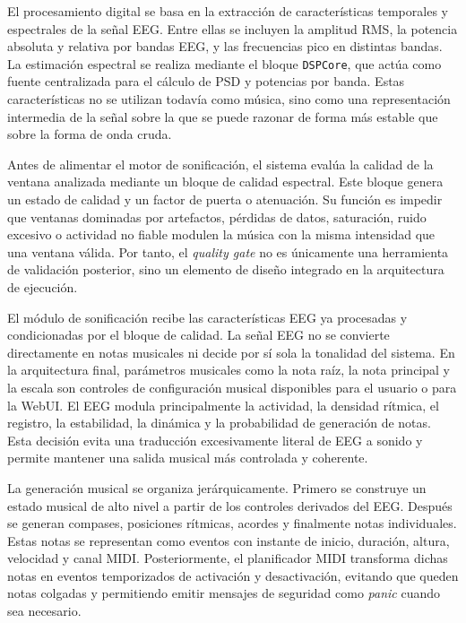 \documentclass[../main.tex]{subfiles}
\begin{document}
El procesamiento digital se basa en la extracción de características temporales y espectrales de la señal EEG. Entre ellas se incluyen la amplitud RMS, la potencia absoluta y relativa por bandas EEG, y las frecuencias pico en distintas bandas. La estimación espectral se realiza mediante el bloque \texttt{DSPCore}, que actúa como fuente centralizada para el cálculo de PSD y potencias por banda. Estas características no se utilizan todavía como música, sino como una representación intermedia de la señal sobre la que se puede razonar de forma más estable que sobre la forma de onda cruda.

Antes de alimentar el motor de sonificación, el sistema evalúa la calidad de la ventana analizada mediante un bloque de calidad espectral. Este bloque genera un estado de calidad y un factor de puerta o atenuación. Su función es impedir que ventanas dominadas por artefactos, pérdidas de datos, saturación, ruido excesivo o actividad no fiable modulen la música con la misma intensidad que una ventana válida. Por tanto, el \textit{quality gate} no es únicamente una herramienta de validación posterior, sino un elemento de diseño integrado en la arquitectura de ejecución.

El módulo de sonificación recibe las características EEG ya procesadas y condicionadas por el bloque de calidad. La señal EEG no se convierte directamente en notas musicales ni decide por sí sola la tonalidad del sistema. En la arquitectura final, parámetros musicales como la nota raíz, la nota principal y la escala son controles de configuración musical disponibles para el usuario o para la WebUI. El EEG modula principalmente la actividad, la densidad rítmica, el registro, la estabilidad, la dinámica y la probabilidad de generación de notas. Esta decisión evita una traducción excesivamente literal de EEG a sonido y permite mantener una salida musical más controlada y coherente.

La generación musical se organiza jerárquicamente. Primero se construye un estado musical de alto nivel a partir de los controles derivados del EEG. Después se generan compases, posiciones rítmicas, acordes y finalmente notas individuales. Estas notas se representan como eventos con instante de inicio, duración, altura, velocidad y canal MIDI. Posteriormente, el planificador MIDI transforma dichas notas en eventos temporizados de activación y desactivación, evitando que queden notas colgadas y permitiendo emitir mensajes de seguridad como \textit{panic} cuando sea necesario.
\end{document}
